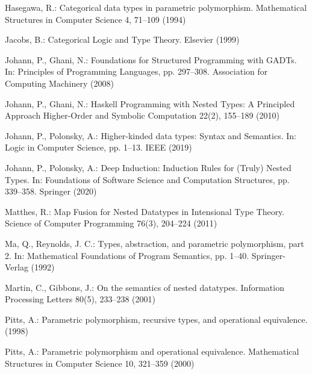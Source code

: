 \documentclass[runningheads]{llncs}
\begin{document}
\begin{thebibliography}{8}
 Hasegawa, R.: Categorical data types in parametric polymorphism. 
 Mathematical Structures in Computer Science  4,  71--109 (1994)

 Jacobs, B.: Categorical Logic and Type Theory. 
  Elsevier (1999)



 Johann, P., Ghani, N.: Foundations for Structured
  Programming with GADTs.  In: Principles of Programming Languages,
  pp. 297--308. Association for Computing Machinery (2008)

 Johann, P., Ghani, N.: Haskell Programming with Nested
  Types: A Principled Approach Higher-Order and Symbolic Computation
  22(2), 155--189 (2010)

 Johann, P., Polonsky, A.: Higher-kinded data types:
  Syntax and Semantics. In: Logic in Computer Science, pp. 1--13. IEEE 
  (2019)

 Johann, P., Polonsky, A.: Deep Induction: Induction
  Rules for (Truly) Nested Types.  In: Foundations of Software Science
  and Computation Structures, pp. 339--358. Springer (2020)

 Matthes, R.: Map Fusion for Nested Datatypes in
  Intensional Type Theory. Science of Computer Programming 76(3),
  204--224 (2011)
    
 Ma, Q., Reynolds, J. C.: Types, abstraction, and
  parametric polymorphism, part 2.  In: Mathematical Foundations of
  Program Semantics, pp. 1--40. Springer-Verlag (1992)

 Martin, C., Gibbons, J.: On the semantics of nested
  datatypes.  Information Processing Letters 80(5), 233--238 (2001)


 Pitts, A.: Parametric polymorphism, recursive types,
  and operational equivalence.  (1998)

 Pitts, A.: Parametric polymorphism and operational equivalence.
  Mathematical Structures in Computer Science 10, 321--359 (2000)


\end{thebibliography}
\end{document}
